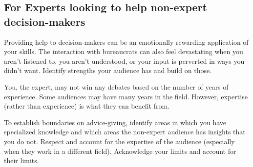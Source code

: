 



\subsection*{For Experts looking to help non-expert decision-makers}

Providing help to decision-makers can be an emotionally rewarding application of your skills. The interaction with bureaucrats can also feel devastating when you aren't listened to, you aren't understood, or your input is perverted in ways you didn't want. %
Identify strengths your audience has and build on those.








You, the expert, may not win any debates based on the number of years of experience. Some audiences may have many years in the field. However, expertise (rather than experience) is what they can benefit from. 

To establish boundaries on advice-giving, identify areas in which you have specialized knowledge and which areas  the non-expert audience has insights that you do not.
Respect and account for the expertise of the audience (especially when they work in a different field). Acknowledge your  limits and account for their limits.

